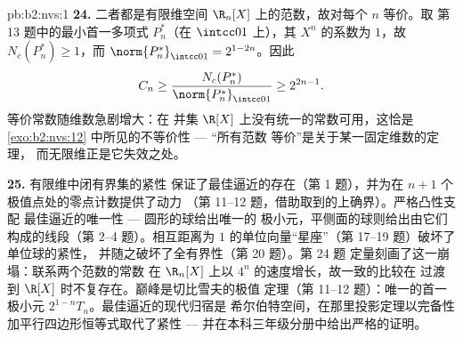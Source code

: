 \begin{solution}{pb:b2:nvs:1}
\textbf{24.} 二者都是有限维空间
$\R_n[X]$ 上的范数，故对每个 $n$ 等价。取
第 13 题中的最小首一多项式 $P^*_n$（在 $\intcc01$ 上），其
$X^n$ 的系数为 $1$，故 $N_c(P^*_n) \geq 1$，而
$\norm{P^*_n}_{\intcc01} = 2^{1-2n}$。因此
\[
C_n \geq \frac{N_c(P^*_n)}{\norm{P^*_n}_{\intcc01}}
\geq 2^{2n-1} .
\]
等价常数随维数急剧增大：在
并集 $\R[X]$ 上没有统一的常数可用，这恰是
\cref{exo:b2:nvs:12} 中所见的不等价性 --- “所有范数
等价”是关于某一固定维数的定理，
而无限维正是它失效之处。

\textbf{25.} 有限维中闭有界集的紧性
保证了最佳逼近的存在（第
1 题），并为在 $n + 1$ 个极值点处的零点计数提供了动力
（第 11--12 题，借助取到的上确界）。严格凸性支配
最佳逼近的唯一性 --- 圆形的球给出唯一的
极小元，平侧面的球则给出由它们构成的线段（第
2--4 题）。相互距离为
$1$ 的单位向量“星座”（第 17--19 题）破坏了单位球的紧性，
并随之破坏了全有界性（第 20 题）。第 24 题
定量刻画了这一崩塌：联系两个范数的常数
在 $\R_n[X]$ 上以 $4^n$ 的速度增长，故一致的比较在
过渡到 $\R[X]$ 时不复存在。巅峰是切比雪夫的极值
定理（第 11--12 题）：唯一的首一极小元
$2^{1-n}T_n$。最佳逼近的现代归宿是
希尔伯特空间，在那里投影定理以完备性
加平行四边形恒等式取代了紧性 ---
并在本科三年级分册中给出严格的证明。
\end{solution}
